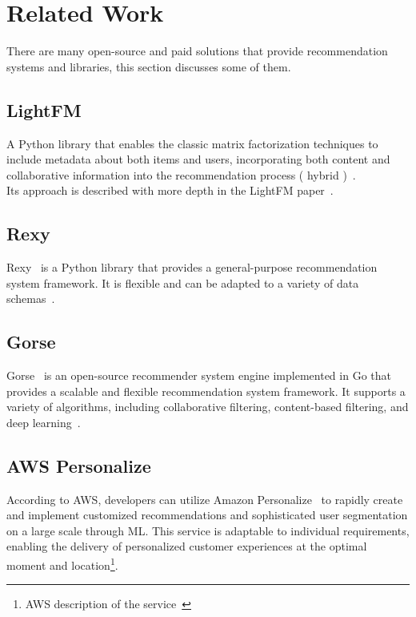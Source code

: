 \section{Related Work}

There are many open-source and paid solutions that provide recommendation systems and libraries, this section discusses some of them.

\subsection{LightFM}
A Python library that enables the classic matrix factorization techniques to include metadata about both items and users, incorporating both content and collaborative information into the recommendation process ( hybrid )~\cite{LightFM}.  \\

Its approach is described with more depth in the LightFM paper~\cite{kula2015metadata}.

\subsection{Rexy}
Rexy~\cite{Rexy} is a Python library that provides a general-purpose recommendation system framework. It is flexible and can be adapted to a variety of data schemas~\cite{Rexy}.

\subsection{Gorse}
Gorse~\cite{Gorse} is an open-source recommender system engine implemented in Go that provides a scalable and flexible recommendation system framework. It supports a variety of algorithms, including collaborative filtering, content-based filtering, and deep learning~\cite{Rexy}.

\subsection{AWS Personalize}
According to AWS, developers can utilize Amazon Personalize~\cite{AWSPersonalize} to rapidly create and implement customized recommendations and sophisticated user segmentation on a large scale through ML. This service is adaptable to individual requirements, enabling the delivery of personalized customer experiences at the optimal moment and location\footnote{AWS description of the service~\cite{AWSPersonalize} }. \\

